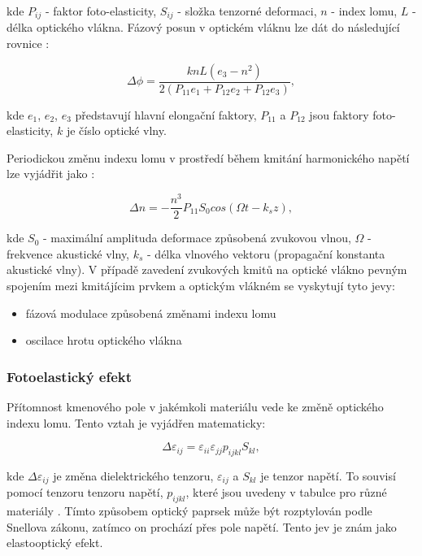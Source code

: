 kde $P_{ij}$ - faktor foto-elasticity, $S_{ij}$ - složka tenzorné deformaci, $n$ - index lomu, $L$ - délka optického vlákna. 
Fázový posun v optickém vláknu lze dát do následující rovnice \cite{419, 420}:

\begin{equation}
\Delta\phi = \frac{knL(e_3 - n^2)}{2(P_{11}e_1 + P_{12}e_2 + P_{12}e_3)},
\end{equation}

kde $e_1$, $e_2$, $e_3$ představují hlavní elongační faktory, $P_{11}$ a $P_{12}$ jsou faktory foto-elasticity, $k$ je číslo optické vlny.

Periodickou změnu indexu lomu v prostředí během kmitání harmonického napětí lze vyjádřit jako \cite{421}:

\begin{equation}
\Delta n = -\frac{n^3}{2}P_{11}S_0 cos(\Omega t - k_s z),
\end{equation}

kde $S_0$ - maximální amplituda deformace způsobená zvukovou vlnou, $\Omega$ - frekvence akustické vlny, $k_s$ - délka vlnového vektoru (propagační konstanta akustické vlny).
V případě zavedení zvukových kmitů na optické vlákno pevným spojením mezi kmitájícim prvkem a optickým vlákném se vyskytují tyto jevy\cite{406, 407}:

\begin{itemize}

\item fázová modulace způsobená změnami indexu lomu

\item oscilace hrotu optického vlákna

\end{itemize}

\subsubsection{Fotoelastický efekt}

Přítomnost kmenového pole v jakémkoli materiálu vede ke změně optického indexu lomu. Tento vztah je vyjádřen matematicky:

\begin{equation}
\Delta\varepsilon_{ij} = \varepsilon_{ii}\varepsilon_{jj}p_{ijkl}S_{kl},
\end{equation}

kde $\Delta\varepsilon_{ij}$ je změna dielektrického tenzoru, $\varepsilon_{ij}$ a $S_{kl}$ je tenzor napětí. To souvisí pomocí tenzoru tenzoru napětí, $p_{ijkl}$, které jsou uvedeny v tabulce pro různé materiály \cite{421}. Tímto způsobem optický paprsek může být rozptylován podle Snellova zákonu, zatímco on prochází přes pole napětí. Tento jev je znám jako elastooptický efekt.

